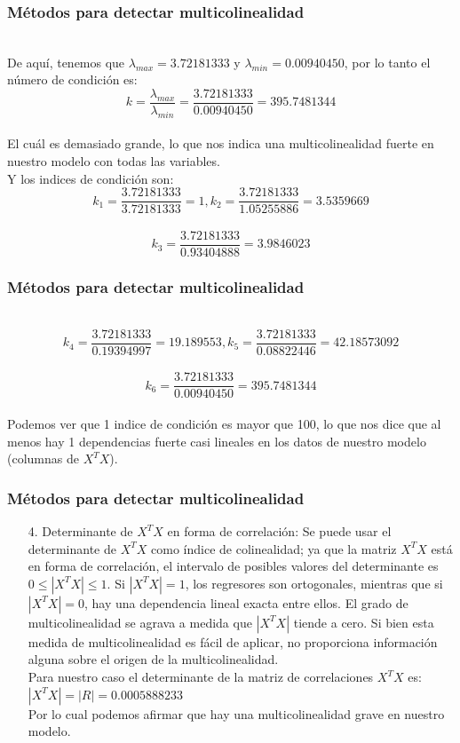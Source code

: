 \documentclass[12pt]{beamer}
\begin{document}
\begin{frame}
\frametitle{Métodos para detectar multicolinealidad}
~\\De aquí, tenemos que $\lambda_{max}=3.72181333$ y $\lambda_{min}=0.00940450$, por lo tanto el número de condición es:
$$k=\frac{\lambda_{max}}{\lambda_{min}}=\frac{3.72181333}{0.00940450}=395.7481344$$
~\\El cuál es demasiado grande, lo que nos indica una multicolinealidad fuerte en nuestro modelo con todas las variables.
~\\Y los indices de condición son:
~\\$$k_{1}=\frac{3.72181333}{3.72181333}=1,k_{2}=\frac{3.72181333}{1.05255886}=3.5359669$$
~\\$$k_{3}=\frac{3.72181333}{0.93404888}=3.9846023$$
\end{frame}

\begin{frame}
\frametitle{Métodos para detectar multicolinealidad}
~\\$$k_{4}=\frac{3.72181333}{0.19394997}=19.189553,k_{5}=\frac{3.72181333}{0.08822446}=42.18573092$$
~\\$$k_{6}=\frac{3.72181333}{0.00940450}=395.7481344$$
~\\Podemos ver que 1 indice de condición es mayor que 100, lo que nos dice que al menos hay 1 dependencias fuerte casi lineales en los datos de nuestro modelo (columnas de $X^{T}X$).
\end{frame}

\begin{frame}
\frametitle{Métodos para detectar multicolinealidad}
\begin{itemize}
\item[4.]Determinante de $X^{T}X$ en forma de correlación: Se puede usar el determinante de $X^{T}X$ como índice de colinealidad; ya que la matriz $X^{T}X$ está en forma de correlación, el intervalo de posibles valores del determinante es $0\leq |X^{T}X| \leq 1$. Si $|X^{T}X| = 1$, los regresores son ortogonales, mientras que si $|X^{T}X|=0$, hay una dependencia lineal exacta entre ellos. El grado de multicolinealidad se agrava a medida que $|X^{T}X|$ tiende a cero. Si bien esta medida de multicolinealidad es fácil de aplicar, no proporciona información alguna sobre el origen de la multicolinealidad.
~\\Para nuestro caso el determinante de la matriz de correlaciones $X^{T}X$ es:$|X^{T}X|=|R|=0.0005888233$
~\\Por lo cual podemos afirmar que hay una multicolinealidad grave en nuestro modelo.
\end{itemize}
\end{frame}
\end{document}

